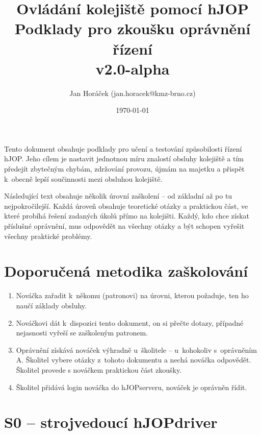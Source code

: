 \documentclass[12pt,a4paper]{article}
\begin{document}
\thispagestyle{empty}

\setlength{\parindent}{0cm}
\setlength{\parskip}{1mm plus2pt minus1pt}

\setlength{\droptitle}{-5em}

\title{
\Large Ovládání kolejiště pomocí hJOP\\
\LARGE Podklady pro zkoušku oprávnění řízení\\
\small v2.0-alpha}
\author{Jan Horáček (jan.horacek@kmz-brno.cz)}
\date{\today}
\maketitle

Tento dokument obsahuje podklady pro učení a testování způsobilosti řízení
hJOP. Jeho cílem je nastavit jednotnou míru znalostí obsluhy kolejiště a tím
předejít zbytečným chybám, zdržování provozu, újmám na majetku a přispět
k~obecně lepší součinnosti mezi obsluhou kolejiště.

Následující text obsahuje několik úrovní zaškolení – od základní až po tu
nejpokročilejší. Každá úroveň obsahuje teoretické otázky a praktickou část, ve
které probíhá řešení zadaných úkolů přímo na kolejišti. Každý, kdo chce získat
příslušné oprávnění, mus odpovědět na všechny otázky a být schopen vyřešit
všechny praktické problémy.

\section{Doporučená metodika zaškolování}

\begin{enumerate}[leftmargin=*]
\item Nováčka zařadit k~někomu (patronovi) na úrovni, kterou požaduje, ten ho
naučí základy obsluhy.
\item Nováčkovi dát k~dispozici tento dokument, on si přečte dotazy, případné
nejasnosti vyřeší se zaškoleným patronem.
\item Oprávnění získává nováček výhradně u~školitele – u~kohokoliv s~oprávněním
A. Školitel vybere otázky z~tohoto dokumentu a nechá nováčka odpovědět. Školitel
provede s nováčkem praktickou část zkoušky.
\item Školitel přidává login nováčka do hJOPserveru, nováček je oprávněn řídit.
\end{enumerate}

\newpage

\section{S0 – strojvedoucí hJOPdriver}
\end{document}
